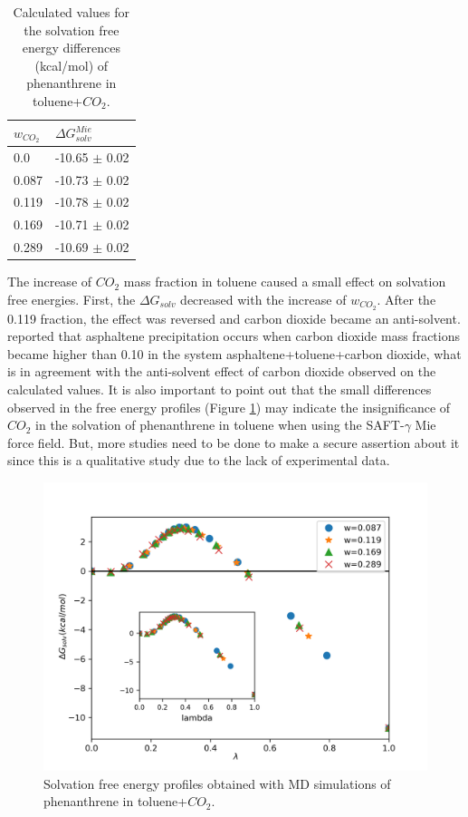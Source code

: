 \FloatBarrier
\begin{table}[H]
\centering
  \caption{Calculated values for the solvation free energy differences (kcal/mol) of phenanthrene in toluene+$CO_{2}$.}
  \label{tbl:solv3}
  \begin{tabular}{ll}
    \hline
    \hline
      $w_{CO_{2}}$ & $\Delta G_{solv}^{Mie}$ \\
    \hline
    0.0    & -10.65 $\pm$ 0.02   \\
    0.087  & -10.73 $\pm$ 0.02   \\
    0.119  & -10.78 $\pm$ 0.02   \\
    0.169  & -10.71 $\pm$ 0.02   \\
    0.289  & -10.69 $\pm$ 0.02   \\
    \hline
    \hline
  \end{tabular}
\end{table}
\FloatBarrier

The increase of $CO_{2}$ mass fraction in toluene caused a small effect on solvation free energies. First, the $\Delta G_{solv}$ decreased with the increase of $w_{CO_{2}}$. After the 0.119 fraction, the effect was reversed and carbon dioxide became an anti-solvent.  reported that asphaltene precipitation occurs when carbon dioxide mass fractions became higher than 0.10 in the system asphaltene+toluene+carbon dioxide, what is in agreement with the anti-solvent effect of carbon dioxide observed on the calculated values. It is also important to point out that the small differences observed in the free energy profiles (Figure \ref{fig:Figure_1}) may indicate the insignificance of $CO_{2}$ in the solvation of phenanthrene in toluene when using the SAFT-$\gamma$ Mie force field. But, more studies need to be done to make a secure assertion about it since this is a qualitative study due to the lack of experimental data.   

\begin{figure}[H]
\centering
\includegraphics[width=0.8\linewidth]{Figures/tolco2}
\caption{Solvation free energy profiles obtained with MD simulations of phenanthrene in toluene+$CO_{2}$.}
\label{fig:Figure_1}
\end{figure}


